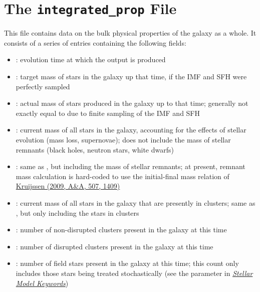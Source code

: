 \documentclass[letterpaper,10pt,english]{sphinxmanual}
\begin{document}
\section{The \texttt{integrated\_prop} File}
\label{output:the-integrated-prop-file}
This file contains data on the bulk physical properties of the galaxy as a whole. It consists of a series of entries containing the following fields:
\begin{itemize}
\item {} 
: evolution time at which the output is produced

\item {} 
: target mass of stars in the galaxy up that time, if the IMF and SFH were perfectly sampled

\item {} 
: actual mass of stars produced in the galaxy up to that time; generally not exactly equal to  due to finite sampling of the IMF and SFH

\item {} 
:  current mass of all stars in the galaxy, accounting for the effects of stellar evolution (mass loss, supernovae); does not include the mass of stellar remnants (black holes, neutron stars, white dwarfs)

\item {} 
: same as , but including the mass of stellar remnants; at present, remnant mass calculation is hard-coded to use the initial-final mass relation of \href{http://adsabs.harvard.edu/abs/2009A\%26A...507.1409K}{Kruijssen (2009, A\&A, 507, 1409)}

\item {} 
: current mass of all stars in the galaxy that are presently in clusters; same as , but only including the stars in clusters

\item {} 
: number of non-disrupted clusters present in the galaxy at this time

\item {} 
: number of disrupted clusters present in the galaxy at this time

\item {} 
: number of field stars present in the galaxy at this time; this count only includes those stars being treated stochastically (see the parameter  in {\hyperref[parameters:ssec-stellar-keywords]{\emph{Stellar Model Keywords}}})

\end{itemize}
\end{document}
